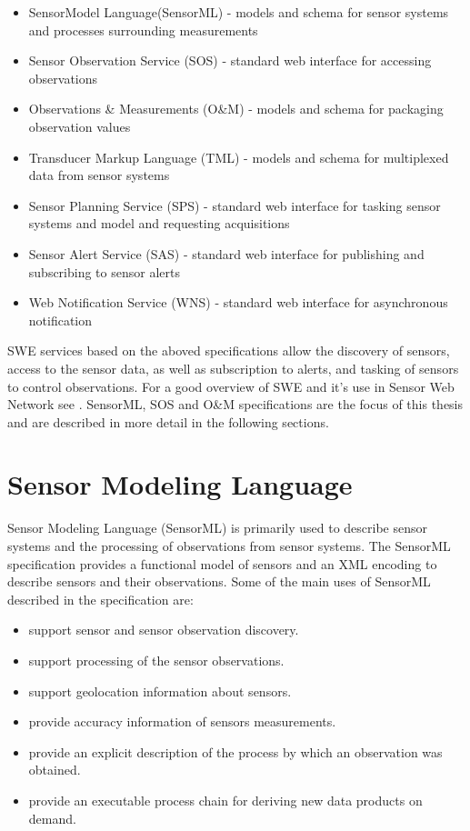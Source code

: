 \documentclass[]{final_report}
\begin{document}
\begin{itemize}
\item  SensorModel Language(SensorML) - models and schema for sensor systems and processes surrounding measurements
\item  Sensor Observation Service (SOS) - standard web interface for accessing observations
\item  Observations \& Measurements (O\&M) - models and schema for packaging observation values
\item  Transducer Markup Language (TML) - models and schema for multiplexed data from sensor systems
\item  Sensor Planning Service (SPS) - standard web interface for tasking sensor systems and model and requesting acquisitions
\item   Sensor Alert Service (SAS) - standard web interface for publishing and subscribing to sensor alerts
\item   Web Notification Service (WNS) - standard web interface for asynchronous notification
\end{itemize}

SWE services based on the aboved specifications allow the discovery of sensors, access to the sensor data, as well as subscription to alerts, and tasking of sensors to control observations. For a good overview of SWE and it's use in Sensor Web Network see \cite{SWEArchref}.  SensorML, SOS and O\&M specifications are the focus of this thesis and are described in more detail in the following sections.


\section{Sensor Modeling Language}\label{SMLsection}
Sensor Modeling Language (SensorML) is primarily used to describe sensor systems and the processing of observations from sensor systems. The SensorML specification\cite{SMLref} provides a functional model of sensors and an XML encoding to describe sensors and their observations. Some of the main uses of SensorML described in the specification are:
\begin{itemize}
\item support sensor and sensor observation discovery.
\item support processing of the sensor observations.
\item support geolocation information about sensors.
\item provide accuracy information of sensors measurements.
\item provide an explicit description of the process by which an observation was obtained.
\item provide an executable process chain for deriving new data products on demand.
\end{itemize}
\end{document}
